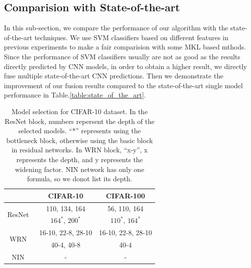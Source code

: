 \documentclass[10pt,twocolumn,letterpaper]{article}
\begin{document}
\subsection{Comparision with State-of-the-art}

In this sub-section, we compare the performance of our algorithm with the state-of-the-art techniques.
We use SVM classifiers based on different features in previous experiments to make a fair comparision with some MKL based mthods.
Since the performance of SVM classifiers usually are not as good as the results directly predicted by CNN models,
in order to obtain a higher result, we directly fuse multiple state-of-the-art CNN predictions.
Then we demonstrate the improvement of our fusion results compared to the state-of-the-art single model performance in Table.\ref{table:state_of_the_art}.

\begin{table}[ht]
\begin{center}
\begin{tabular}{ c | c | c }
    \hline
                                              & CIFAR-10             & CIFAR-100  \\\hline
\multirow{2}{*}{ResNet~\cite{he2016identity}} & 110, 134, 164        & 56, 110, 164  \\
                                              & $164^{*}$, $200^{*}$ & $110^{*}$, $164^{*}$  \\\hline
\multirow{2}{*}{WRN~\cite{zagoruyko2016wide}} & 16-10, 22-8, 28-10   & 16-10, 22-8, 28-10  \\
                                              &    40-4, 40-8        & 40-4  \\\hline
NIN~\cite{lin2013network}                     &     -                & -  \\ \hline
\end{tabular}
\end{center}
\caption{Model selection for CIFAR-10 dataset.
In the ResNet block, numbers repersent the depth of the selected models.
``*'' represents using the bottleneck block, otherwise using the basic block in residual networks.
In WRN block, ``x-y'', x represents the depth, and y represents the widening factor.
NIN network has only one formula, so we donot list its depth.}
\label{table:models}
\end{table}
\end{document}

